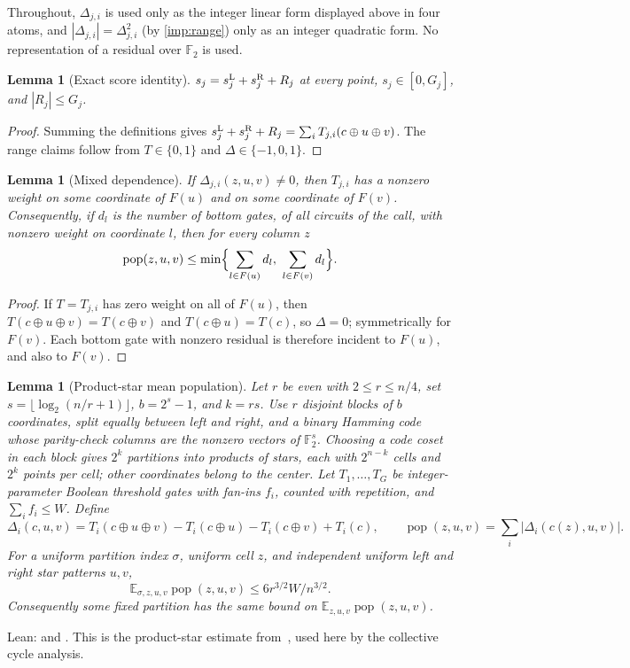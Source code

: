 \documentclass[11pt,letterpaper]{article}
\newtheorem{lemma}[theorem]{Lemma}
\theoremstyle{definition}
\theoremstyle{remark}
\newcommand{\E}{\mathbb E}
\newcommand{\F}{\mathbb F}
\newcommand{\pop}{\operatorname{pop}}
\begin{document}
Throughout, \(\Delta_{j,i}\) is used only as the integer linear form
displayed above in four atoms, and \(|\Delta_{j,i}|=\Delta_{j,i}^2\)
(by \cref{imp:range}) only as an integer quadratic form. No
representation of a residual over \(\F_2\) is used.

\begin{lemma}[Exact score identity]\label{lem:identity}
\(s_j=s^{\rm L}_j+s^{\rm R}_j+R_j\) at every point,
\(s_j\in[0,G_j]\), and \(|R_j|\le G_j\).
\end{lemma}
\begin{proof}
Summing the definitions gives
\(s^{\rm L}_j+s^{\rm R}_j+R_j=\sum_iT_{j,i}(c\oplus u\oplus v)\). The
range claims follow from \(T\in\{0,1\}\) and \(\Delta\in\{-1,0,1\}\).
\end{proof}

\begin{lemma}[Mixed dependence]\label{lem:mixed}
If \(\Delta_{j,i}(z,u,v)\ne0\), then \(T_{j,i}\) has a nonzero weight on
some coordinate of \(F(u)\) and on some coordinate of \(F(v)\).
Consequently, if \(d_l\) is the number of bottom gates, of all circuits
of the call, with nonzero weight on coordinate \(l\), then for every
column \(z\)
\[
 \pop(z,u,v)\le\min\Bigl\{\sum_{l\in F(u)}d_l,\ \sum_{l\in F(v)}d_l\Bigr\}.
\]
\end{lemma}
\begin{proof}
If \(T=T_{j,i}\) has zero weight on all of \(F(u)\), then
\(T(c\oplus u\oplus v)=T(c\oplus v)\) and \(T(c\oplus u)=T(c)\), so
\(\Delta=0\); symmetrically for \(F(v)\). Each bottom gate with nonzero
residual is therefore incident to \(F(u)\), and also to \(F(v)\).
\end{proof}

\begin{lemma}[Product-star mean population]\label{lem:meanpop}
Let \(r\) be even with \(2\le r\le n/4\), set \(s=\lfloor\log_2(n/r+1)\rfloor\), \(b=2^s-1\), and \(k=rs\).
Use \(r\) disjoint blocks of \(b\) coordinates, split equally between left and right, and a binary Hamming code whose parity-check columns are the nonzero vectors of \(\F_2^s\).
Choosing a code coset in each block gives \(2^k\) partitions into products of stars, each with \(2^{n-k}\) cells and \(2^k\) points per cell; other coordinates belong to the center.
Let \(T_1,\ldots,T_G\) be integer-parameter Boolean threshold gates with fan-ins \(f_i\), counted with repetition, and \(\sum_i f_i\le W\). Define
\[
 \Delta_i(c,u,v)=T_i(c\oplus u\oplus v)-T_i(c\oplus u)-T_i(c\oplus v)+T_i(c),
 \qquad \pop(z,u,v)=\sum_i|\Delta_i(c(z),u,v)|.
\]
For a uniform partition index \(\sigma\), uniform cell \(z\), and independent uniform left and right star patterns \(u,v\),
\[
 \E_{\sigma,z,u,v}\pop(z,u,v)\le6r^{3/2}W/n^{3/2}.
\]
Consequently some fixed partition has the same bound on \(\E_{z,u,v}\pop(z,u,v)\).
\end{lemma}
Lean:  and . This is the product-star estimate from~\cite[Appendix~A]{Nag72}, used here by the collective cycle analysis.
\end{document}
